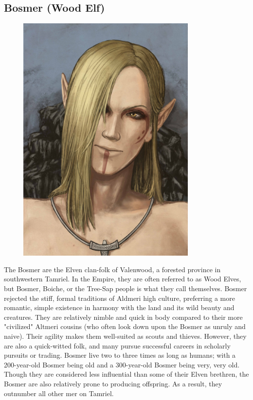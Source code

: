 \documentclass[12pt]{book}
\begin{document}
\subsection{Bosmer (Wood Elf)}
\begin{figure}
	\includegraphics[width=\textwidth]{Bosmer.png}
\end{figure}

The Bosmer are the Elven clan-folk of Valenwood, a forested province in southwestern Tamriel. In the Empire, they are often referred to as Wood Elves, but Bosmer, Boiche, or the Tree-Sap people is what they call themselves. Bosmer rejected the stiff, formal traditions of Aldmeri high culture, preferring a more romantic, simple existence in harmony with the land and its wild beauty and creatures. They are relatively nimble and quick in body compared to their more "civilized" Altmeri cousins (who often look down upon the Bosmer as unruly and naive). Their agility makes them well-suited as scouts and thieves. However, they are also a quick-witted folk, and many pursue successful careers in scholarly pursuits or trading. Bosmer live two to three times as long as humans; with a 200-year-old Bosmer being old and a 300-year-old Bosmer being very, very old. Though they are considered less influential than some of their Elven brethren, the Bosmer are also relatively prone to producing offspring. As a result, they outnumber all other mer on Tamriel.\\
\end{document}
